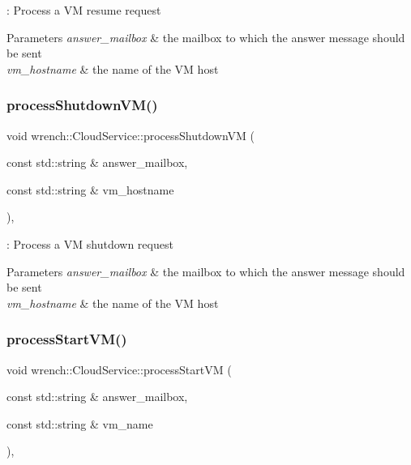 \+: Process a VM resume request 


\begin{DoxyParams}{Parameters}
{\em answer\+\_\+mailbox} & the mailbox to which the answer message should be sent \\
\hline
{\em vm\+\_\+hostname} & the name of the VM host \\
\hline
\end{DoxyParams}
\mbox{\label{classwrench_1_1_cloud_service_ac485870adfad2159ff5b84cb60be0b1d}} 
\subsubsection{\texorpdfstring{process\+Shutdown\+V\+M()}{processShutdownVM()}}
{\footnotesize\ttfamily void wrench\+::\+Cloud\+Service\+::process\+Shutdown\+VM (\begin{DoxyParamCaption}\item[{const std\+::string \&}]{answer\+\_\+mailbox,  }\item[{const std\+::string \&}]{vm\+\_\+hostname }\end{DoxyParamCaption})\hspace{0.3cm}{\ttfamily [protected]}, {\ttfamily [virtual]}}



\+: Process a VM shutdown request 


\begin{DoxyParams}{Parameters}
{\em answer\+\_\+mailbox} & the mailbox to which the answer message should be sent \\
\hline
{\em vm\+\_\+hostname} & the name of the VM host \\
\hline
\end{DoxyParams}
\mbox{\label{classwrench_1_1_cloud_service_a1882c193da0b8acfaeb9368751b2caac}} 
\subsubsection{\texorpdfstring{process\+Start\+V\+M()}{processStartVM()}}
{\footnotesize\ttfamily void wrench\+::\+Cloud\+Service\+::process\+Start\+VM (\begin{DoxyParamCaption}\item[{const std\+::string \&}]{answer\+\_\+mailbox,  }\item[{const std\+::string \&}]{vm\+\_\+name }\end{DoxyParamCaption})\hspace{0.3cm}{\ttfamily [protected]}, {\ttfamily [virtual]}}



